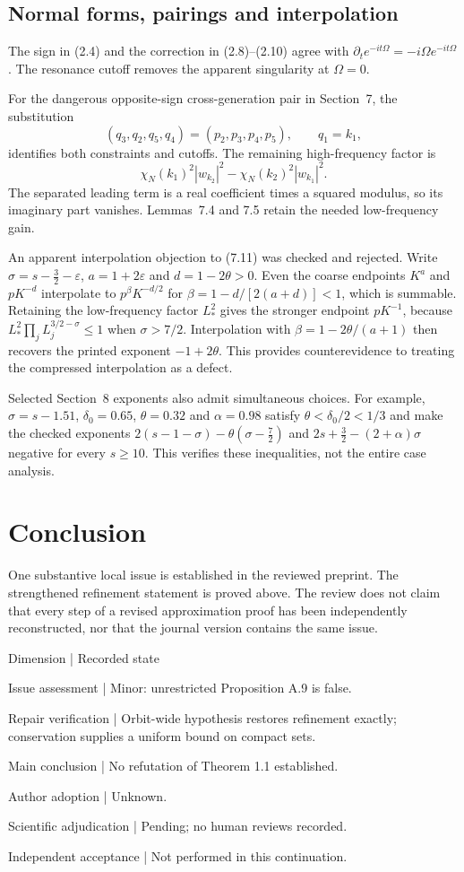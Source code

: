\documentclass[10pt]{article}
\begin{document}
\subsection*{Normal forms, pairings and interpolation}
The sign in (2.4) and the correction in (2.8)–(2.10) agree with \(\partial_t e^{-it\Omega}=-i\Omega e^{-it\Omega}\). The resonance cutoff removes the apparent singularity at \(\Omega=0\).\par
For the dangerous opposite-sign cross-generation pair in Section 7, the substitution \[(q_3,q_2,q_5,q_4)=(p_2,p_3,p_4,p_5),\qquad q_1=k_1,\] identifies both constraints and cutoffs. The remaining high-frequency factor is \[\chi_N(k_1)^2|w_{k_2}|^2-
 \chi_N(k_2)^2|w_{k_1}|^2.\] The separated leading term is a real coefficient times a squared modulus, so its imaginary part vanishes. Lemmas 7.4 and 7.5 retain the needed low-frequency gain.\par
An apparent interpolation objection to (7.11) was checked and rejected. Write \(\sigma=s-\tfrac32-\varepsilon\), \(a=1+2\varepsilon\) and \(d=1-2\theta>0\). Even the coarse endpoints \(K^a\) and \(pK^{-d}\) interpolate to \(p^\beta K^{-d/2}\) for \(\beta=1-d/[2(a+d)]<1\), which is summable. Retaining the low-frequency factor \(L_*^2\) gives the stronger endpoint \(pK^{-1}\), because \(L_*^2\prod_j L_j^{3/2-\sigma}\leq1\) when \(\sigma>7/2\). Interpolation with \(\beta=1-2\theta/(a+1)\) then recovers the printed exponent \(-1+2\theta\). This provides counterevidence to treating the compressed interpolation as a defect.\par
Selected Section 8 exponents also admit simultaneous choices. For example, \(\sigma=s-1.51\), \(\delta_0=0.65\), \(\theta=0.32\) and \(\alpha=0.98\) satisfy \(\theta<\delta_0/2<1/3\) and make the checked exponents \(2(s-1-\sigma)-\theta(\sigma-\tfrac72)\) and \(2s+\tfrac32-(2+\alpha)\sigma\) negative for every \(s\geq10\). This verifies these inequalities, not the entire case analysis.\par
\section*{Conclusion}
One substantive local issue is established in the reviewed preprint. The strengthened refinement statement is proved above. The review does not claim that every step of a revised approximation proof has been independently reconstructed, nor that the journal version contains the same issue.\par
Dimension | Recorded state\par
Issue assessment | Minor: unrestricted Proposition A.9 is false.\par
Repair verification | Orbit-wide hypothesis restores refinement exactly; conservation supplies a uniform bound on compact sets.\par
Main conclusion | No refutation of Theorem 1.1 established.\par
Author adoption | Unknown.\par
Scientific adjudication | Pending; no human reviews recorded.\par
Independent acceptance | Not performed in this continuation.\par
\end{document}
